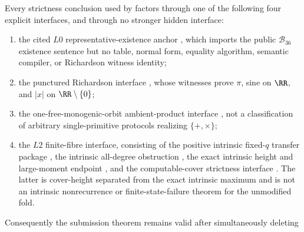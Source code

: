 \begin{proposition}
\label{thm:main-hierarchy-exact-scope-closure}
\label{thm:missing-results-scope-discharge}
\label{thm:main-spine-scope-closure}
\label{thm:main-theorem-scope-projection}
Every strictness conclusion used by  factors through one
of the following four explicit interfaces, and through no stronger hidden
interface:
\begin{enumerate}
\item the cited \(L0\) representative-existence anchor
  , which imports the
  public \(\mathcal B_{36}\) existence sentence but no table, normal form,
  equality algorithm, semantic compiler, or Richardson witness identity;
\item the punctured Richardson interface
  , whose
  witnesses prove \(\pi\), sine on \(\RR\), and \(|x|\) on
  \(\RR\setminus\{0\}\);
\item the one-free-monogenic-orbit ambient-product interface
  ,
  not a classification of arbitrary single-primitive protocols realizing
  \(\{+,\times\}\);
\item the \(L2\) finite-fibre interface, consisting of the positive intrinsic
  fixed-\(q\) transfer package
  ,
  the intrinsic all-degree obstruction
  ,
  the exact intrinsic height and large-moment endpoint
  ,
  and the computable-cover strictness interface
  .  The latter is
  cover-height separated from the exact intrinsic maximum and is not an intrinsic
  nonrecurrence or finite-state-failure theorem for the unmodified fold.
\end{enumerate}
Consequently the submission theorem remains valid after simultaneously deleting

\end{proposition}
